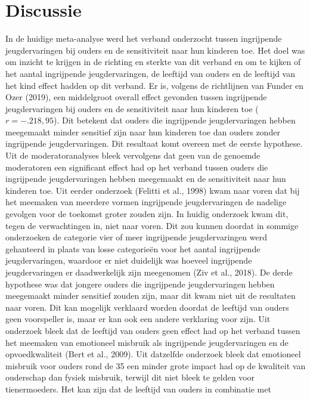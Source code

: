 \documentclass[12pt]{article}
\begin{document}
\section{Discussie}\label{discussie}

In de huidige meta-analyse werd het verband onderzocht tussen
ingrijpende jeugdervaringen bij ouders en de sensitiviteit naar hun
kinderen toe. Het doel was om inzicht te krijgen in de richting en
sterkte van dit verband en om te kijken of het aantal ingrijpende
jeugdervaringen, de leeftijd van ouders en de leeftijd van het kind
effect hadden op dit verband. Er is, volgens de richtlijnen van Funder
en Ozer (2019), een middelgroot overall effect gevonden tussen
ingrijpende jeugdervaringen bij ouders en de sensitiviteit naar hun
kinderen toe (\(r = -.218, 95%
\)). Dit betekent dat ouders die ingrijpende jeugdervaringen hebben
meegemaakt minder sensitief zijn naar hun kinderen toe dan ouders zonder
ingrijpende jeugdervaringen. Dit resultaat komt overeen met de eerste
hypothese. Uit de moderatoranalyses bleek vervolgens dat geen van de
genoemde moderatoren een significant effect had op het verband tussen
ouders die ingrijpende jeugdervaringen hebben meegemaakt en de
sensitiviteit naar hun kinderen toe. Uit eerder onderzoek (Felitti et
al., 1998) kwam naar voren dat bij het meemaken van meerdere vormen
ingrijpende jeugdervaringen de nadelige gevolgen voor de toekomst groter
zouden zijn. In huidig onderzoek kwam dit, tegen de verwachtingen in,
niet naar voren. Dit zou kunnen doordat in sommige onderzoeken de
categorie vier of meer ingrijpende jeugdervaringen werd gehanteerd in
plaats van losse categorieën voor het aantal ingrijpende
jeugdervaringen, waardoor er niet duidelijk was hoeveel ingrijpende
jeugdervaringen er daadwerkelijk zijn meegenomen (Ziv et al., 2018). De
derde hypothese was dat jongere ouders die ingrijpende jeugdervaringen
hebben meegemaakt minder sensitief zouden zijn, maar dit kwam niet uit
de resultaten naar voren. Dit kan mogelijk verklaard worden doordat de
leeftijd van ouders geen voorspeller is, maar er kan ook een andere
verklaring voor zijn. Uit onderzoek bleek dat de leeftijd van ouders
geen effect had op het verband tussen het meemaken van emotioneel
misbruik als ingrijpende jeugdervaringen en de opvoedkwaliteit (Bert et
al., 2009). Uit datzelfde onderzoek bleek dat emotioneel misbruik voor
ouders rond de 35 een minder grote impact had op de kwaliteit van
ouderschap dan fysiek misbruik, terwijl dit niet bleek te gelden voor
tienermoeders. Het kan zijn dat de leeftijd van ouders in combinatie met
\end{document}
